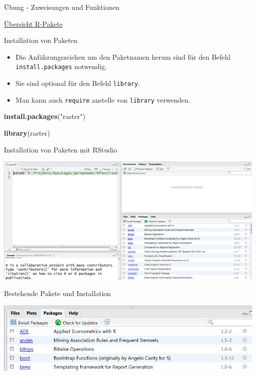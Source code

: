 \documentclass[ignorenonframetext,]{beamer}
\newenvironment{Shaded}{\begin{snugshade}}{\end{snugshade}}
\newcommand{\KeywordTok}[1]{\textcolor[rgb]{0.26,0.66,0.93}{\textbf{#1}}}
\newcommand{\NormalTok}[1]{\textcolor[rgb]{0.74,0.68,0.62}{#1}}
\newcommand{\StringTok}[1]{\textcolor[rgb]{0.02,0.61,0.04}{#1}}
\providecommand{\tightlist}{%
  \setlength{\itemsep}{0pt}\setlength{\parskip}{0pt}}
\begin{document}
\begin{frame}[fragile]{Übung - Zuweisungen und Funktionen}
\begin{frame}{\href{https://www.youtube.com/watch?v=kKI9--Opmso}{Übersicht
R-Pakete}}
\end{frame}

\begin{frame}[fragile]{Installation von Paketen}
\protect\hypertarget{installation-von-paketen}{}

\begin{itemize}
\tightlist
\item
  Die Anführungszeichen um den Paketnamen herum sind für den Befehl
  \texttt{install.packages} notwendig.
\item
  Sie sind optional für den Befehl \texttt{library}.
\item
  Man kann auch \texttt{require} anstelle von \texttt{library}
  verwenden.
\end{itemize}

\begin{Shaded}
\begin{Highlighting}[]
\KeywordTok{install.packages}\NormalTok{(}\StringTok{"raster"}\NormalTok{)}

\KeywordTok{library}\NormalTok{(raster)}
\end{Highlighting}
\end{Shaded}

\end{frame}

\begin{frame}{Installation von Paketen mit RStudio}
\protect\hypertarget{installation-von-paketen-mit-rstudio}{}

\includegraphics{figure/PaketeRstudio.PNG}

\end{frame}

\begin{frame}{Bestehende Pakete und Installation}
\protect\hypertarget{bestehende-pakete-und-installation}{}

\includegraphics{figure/packages3.PNG}


\end{frame}
\end{frame}
\end{document}
